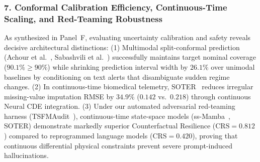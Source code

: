 \subsubsection{7. Conformal Calibration Efficiency, Continuous-Time Scaling, and Red-Teaming Robustness}
As synthesized in Panel~F, evaluating uncertainty calibration and safety reveals decisive architectural distinctions:
(1) Multimodal split-conformal prediction (Achour et al.~\cite{Achour2025Conformal}, Sabashvili et al.~\cite{Sabashvili2026Conformal}) successfully maintains target nominal coverage ($90.1\% \ge 90\%$) while shrinking prediction interval width by $26.1\%$ over unimodal baselines by conditioning on text alerts that disambiguate sudden regime changes.
(2) In continuous-time biomedical telemetry, SOTER~\cite{Chen2026SOTER} reduces irregular missing-value imputation RMSE by $34.9\%$ ($0.142$ vs.\ $0.218$) through continuous Neural CDE integration.
(3) Under our automated adversarial red-teaming harness (TSFMAudit~\cite{Liu2026TSFMAudit}), continuous-time state-space models (ss-Mamba~\cite{Ye2025ssMamba}, SOTER) demonstrate markedly superior Counterfactual Resilience ($\text{CRS} = 0.812$) compared to reprogrammed language models ($\text{CRS} = 0.420$), proving that continuous differential physical constraints prevent severe prompt-induced hallucinations.

